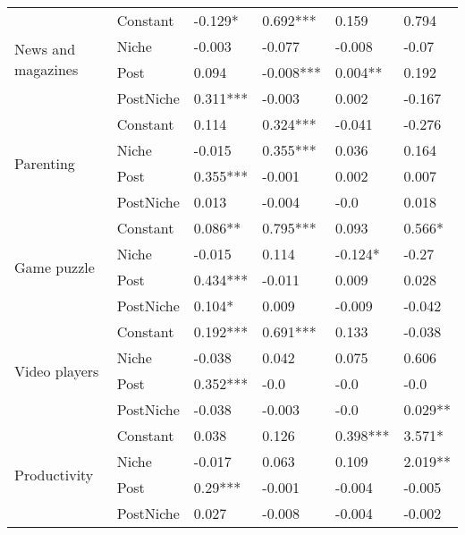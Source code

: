 \begin{longtable}[h!]{llllll}
\cline{1-6}
\multirow{4}{*}{News and magazines} & Constant &             -0.129* &    0.692*** &      0.159 &      0.794 \\
          & Niche &              -0.003 &      -0.077 &     -0.008 &      -0.07 \\
          & Post &               0.094 &   -0.008*** &    0.004** &      0.192 \\
          & PostNiche &            0.311*** &      -0.003 &      0.002 &     -0.167 \\
\cline{1-6}
\multirow{4}{*}{Parenting} & Constant &               0.114 &    0.324*** &     -0.041 &     -0.276 \\
          & Niche &              -0.015 &    0.355*** &      0.036 &      0.164 \\
          & Post &            0.355*** &      -0.001 &      0.002 &      0.007 \\
          & PostNiche &               0.013 &      -0.004 &       -0.0 &      0.018 \\
\cline{1-6}
\multirow{4}{*}{Game puzzle} & Constant &             0.086** &    0.795*** &      0.093 &     0.566* \\
          & Niche &              -0.015 &       0.114 &    -0.124* &      -0.27 \\
          & Post &            0.434*** &      -0.011 &      0.009 &      0.028 \\
          & PostNiche &              0.104* &       0.009 &     -0.009 &     -0.042 \\
\cline{1-6}
\multirow{4}{*}{Video players} & Constant &            0.192*** &    0.691*** &      0.133 &     -0.038 \\
          & Niche &              -0.038 &       0.042 &      0.075 &      0.606 \\
          & Post &            0.352*** &        -0.0 &       -0.0 &       -0.0 \\
          & PostNiche &              -0.038 &      -0.003 &       -0.0 &    0.029** \\
\cline{1-6}
\multirow{4}{*}{Productivity} & Constant &               0.038 &       0.126 &   0.398*** &     3.571* \\
          & Niche &              -0.017 &       0.063 &      0.109 &    2.019** \\
          & Post &             0.29*** &      -0.001 &     -0.004 &     -0.005 \\
          & PostNiche &               0.027 &      -0.008 &     -0.004 &     -0.002 \\

\end{longtable}
